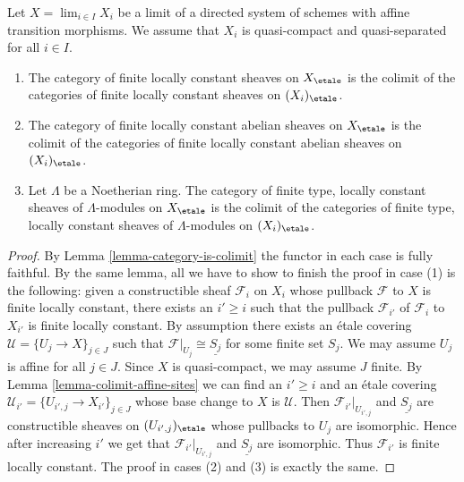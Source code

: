 \begin{lemma}
\label{lemma-category-loc-cst-is-colimit}
Let $X = \lim_{i \in I} X_i$ be a limit of a directed
system of schemes with affine transition morphisms.
We assume that $X_i$ is quasi-compact and quasi-separated
for all $i \in I$.
\begin{enumerate}
\item The category of finite locally constant sheaves on $X_\etale$
is the colimit of the categories of finite locally constant sheaves
on $(X_i)_\etale$.
\item The category of finite locally constant abelian sheaves on $X_\etale$
is the colimit of the categories of finite locally constant abelian sheaves
on $(X_i)_\etale$.
\item Let $\Lambda$ be a Noetherian ring. The category of finite type,
locally constant sheaves of $\Lambda$-modules on $X_\etale$
is the colimit of the categories of finite type, locally constant
sheaves of $\Lambda$-modules on $(X_i)_\etale$.
\end{enumerate}
\end{lemma}

\begin{proof}
By Lemma \ref{lemma-category-is-colimit} the functor in each case
is fully faithful. By the same lemma, all we have to show to finish
the proof in case (1) is the following: given a constructible sheaf
$\mathcal{F}_i$ on $X_i$ whose pullback $\mathcal{F}$ to $X$ is
finite locally constant, there exists an $i' \geq i$ such that the
pullback $\mathcal{F}_{i'}$ of $\mathcal{F}_i$ to $X_{i'}$
is finite locally constant. By assumption there exists an \'etale covering
$\mathcal{U} = \{U_j \to X\}_{j \in J}$
such that $\mathcal{F}|_{U_j} \cong \underline{S_j}$ for some finite set $S_j$.
We may assume $U_j$ is affine for all $j \in J$.
Since $X$ is quasi-compact, we may assume $J$ finite.
By Lemma \ref{lemma-colimit-affine-sites} we can find an $i' \geq i$
and an \'etale covering $\mathcal{U}_{i'} = \{U_{i', j} \to X_{i'}\}_{j \in J}$
whose base change to $X$ is $\mathcal{U}$. Then
$\mathcal{F}_{i'}|_{U_{i', j}}$ and $\underline{S_j}$ are
constructible sheaves on $(U_{i', j})_\etale$ whose pullbacks to
$U_j$ are isomorphic. Hence after increasing $i'$ we get
that $\mathcal{F}_{i'}|_{U_{i', j}}$ and $\underline{S_j}$
are isomorphic. Thus $\mathcal{F}_{i'}$ is finite locally constant.
The proof in cases (2) and (3) is exactly the same.
\end{proof}

